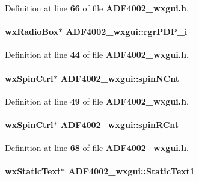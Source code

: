 Definition at line {\bf 66} of file {\bf A\+D\+F4002\+\_\+wxgui.\+h}.

\paragraph[{rgr\+P\+D\+P\+\_\+i}]{\setlength{\rightskip}{0pt plus 5cm}wx\+Radio\+Box$\ast$ A\+D\+F4002\+\_\+wxgui\+::rgr\+P\+D\+P\+\_\+i}\label{classADF4002__wxgui_a9d3efc7518844886522f2b006c89dc3c}


Definition at line {\bf 44} of file {\bf A\+D\+F4002\+\_\+wxgui.\+h}.

\paragraph[{spin\+N\+Cnt}]{\setlength{\rightskip}{0pt plus 5cm}wx\+Spin\+Ctrl$\ast$ A\+D\+F4002\+\_\+wxgui\+::spin\+N\+Cnt}\label{classADF4002__wxgui_a638ee1d5cdd1624474e1090d0d88f1b6}


Definition at line {\bf 49} of file {\bf A\+D\+F4002\+\_\+wxgui.\+h}.

\paragraph[{spin\+R\+Cnt}]{\setlength{\rightskip}{0pt plus 5cm}wx\+Spin\+Ctrl$\ast$ A\+D\+F4002\+\_\+wxgui\+::spin\+R\+Cnt}\label{classADF4002__wxgui_a688ccb9d38fd436588a57cfd7a3b3bf4}


Definition at line {\bf 68} of file {\bf A\+D\+F4002\+\_\+wxgui.\+h}.

\paragraph[{Static\+Text1}]{\setlength{\rightskip}{0pt plus 5cm}wx\+Static\+Text$\ast$ A\+D\+F4002\+\_\+wxgui\+::\+Static\+Text1}\label{classADF4002__wxgui_aaca09b286c6d5e29bbe7d053b76a11e9}


